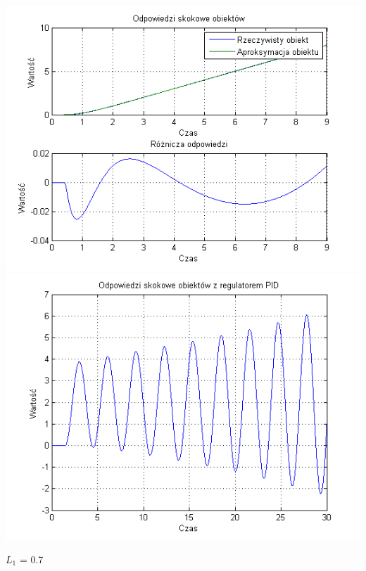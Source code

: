 \documentclass[10pt,a4paper]{article}
\begin{document}
\begin{center}
\includegraphics[scale=1]{images/dwa/skrypt_145.png}\\
\includegraphics[scale=1]{images/dwa/skrypt_146.png}\\
\end{center}
\newpage
$L_1$ = 0.7
\end{document}
